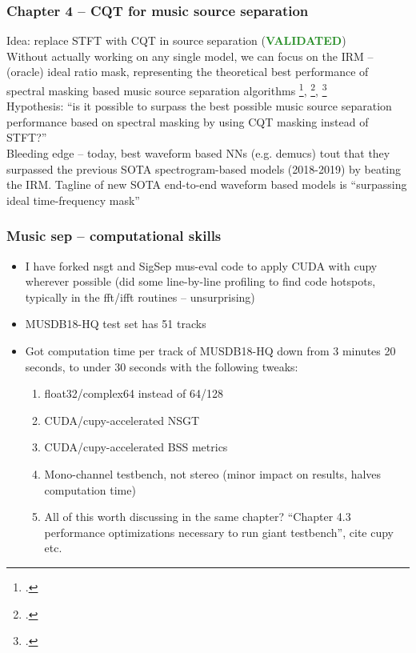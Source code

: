 \documentclass[usenames,dvipsnames]{beamer}
\begin{document}
\begin{frame}
	\frametitle{Chapter 4 -- CQT for music source separation}
	Idea: replace STFT with CQT in source separation (\textcolor{ForestGreen}{\textbf{VALIDATED}})\\
	\vspace{0.5em}
	Without actually working on any single model, we can focus on the IRM -- (oracle) ideal ratio mask, representing the theoretical  best performance of spectral masking based music source separation algorithms \footcite{irm}, \footcite{sigsep2018}, \footcite{vincent07}\\
	\vspace{0.5em}
	Hypothesis: ``is it possible to surpass the best possible music source separation performance based on spectral masking by using CQT masking instead of STFT?''\\
	\vspace{0.5em}
	Bleeding edge -- today, best waveform based NNs (e.g. demucs) tout that they surpassed the previous SOTA spectrogram-based models (2018-2019) by beating the IRM. Tagline of new SOTA end-to-end waveform based models is ``surpassing ideal time-frequency mask''
\end{frame}

\begin{frame}
	\frametitle{Music sep -- computational skills}
	\begin{itemize}
		\item
			I have forked nsgt and SigSep mus-eval code to apply CUDA with cupy wherever possible (did some line-by-line profiling to find code hotspots, typically in the fft/ifft routines -- unsurprising)
		\item
			MUSDB18-HQ test set has 51 tracks
		\item
			Got computation time per track of MUSDB18-HQ down from 3 minutes 20 seconds, to under 30 seconds with the following tweaks:
			\begin{enumerate}
				\item
					float32/complex64 instead of 64/128
				\item
					CUDA/cupy-accelerated NSGT
				\item
					CUDA/cupy-accelerated BSS metrics
				\item
					Mono-channel testbench, not stereo (minor impact on results, halves computation time)
				\item
					All of this worth discussing in the same chapter? ``Chapter 4.3 performance optimizations necessary to run giant testbench'', cite cupy etc.
			\end{enumerate}
	\end{itemize}
\end{frame}
\end{document}
